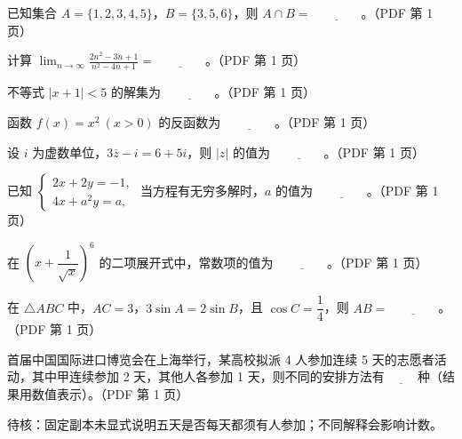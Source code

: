 \begin{question}
已知集合 $A=\{1,2,3,4,5\}$，$B=\{3,5,6\}$，则 $A\cap B=\underline{\qquad\qquad}$。（PDF 第 1 页）

\end{question}
\begin{question}
计算 $\displaystyle\lim_{n\to\infty}\frac{2n^2-3n+1}{n^2-4n+1}=\underline{\qquad\qquad}$。（PDF 第 1 页）

\end{question}
\begin{question}
不等式 $|x+1|<5$ 的解集为 $\underline{\qquad\qquad}$。（PDF 第 1 页）

\end{question}
\begin{question}
函数 $f(x)=x^2\ (x>0)$ 的反函数为 $\underline{\qquad\qquad}$。（PDF 第 1 页）

\end{question}
\begin{question}
设 $i$ 为虚数单位，$3\overline z-i=6+5i$，则 $|z|$ 的值为 $\underline{\qquad\qquad}$。（PDF 第 1 页）

\end{question}
\begin{question}
已知 $\begin{cases}2x+2y=-1,\\4x+a^2y=a,\end{cases}$ 当方程有无穷多解时，$a$ 的值为 $\underline{\qquad\qquad}$。（PDF 第 1 页）

\end{question}
\begin{question}
在 $\left(x+\dfrac{1}{\sqrt{x}}\right)^6$ 的二项展开式中，常数项的值为 $\underline{\qquad\qquad}$。（PDF 第 1 页）

\end{question}
\begin{question}
在 $\triangle ABC$ 中，$AC=3$，$3\sin A=2\sin B$，且 $\cos C=\dfrac14$，则 $AB=\underline{\qquad\qquad}$。（PDF 第 1 页）

\end{question}
\begin{question}
首届中国国际进口博览会在上海举行，某高校拟派 4 人参加连续 5 天的志愿者活动，其中甲连续参加 2 天，其他人各参加 1 天，则不同的安排方法有 $\underline{\qquad}$ 种（结果用数值表示）。（PDF 第 1 页）

\begin{gktip}
待核：固定副本未显式说明五天是否每天都须有人参加；不同解释会影响计数。
\end{gktip}

\Needspace{0.4\textheight}
\end{question}
